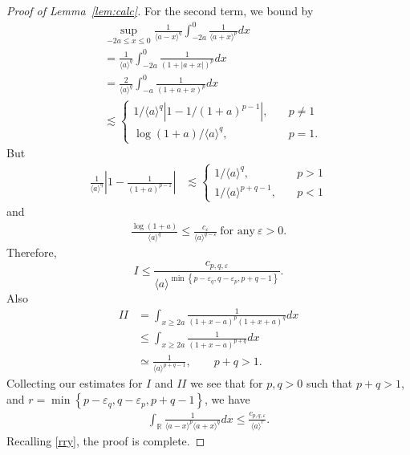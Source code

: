 \documentclass[12pt,reqno]{amsart}
\numberwithin{equation}{section}  %
\numberwithin{figure}{section}
\newcommand{\rr}{\mathbb{R}}
\newcommand{\ee}{\varepsilon}
\begin{document}
\begin{proof}[Proof of Lemma~\ref{lem:calc}]
%
For the second term, we bound by
%
%
\begin{equation*}
\begin{split}
& \sup_{-2a \le x \le 0} \frac{1}{\langle a - x \rangle
^{q}} \int_{-2a}^{0} \frac{1}{\langle a + x \rangle ^{p}} d x
\\
& = \frac{1}{\langle a \rangle ^{q}} \int_{-2a}^{0} \frac{1}{(1 + | a +
x
|)^{p}} d x 
\\
& = \frac{2}{\langle a \rangle ^{q}} \int_{-a}^{0} \frac{1}{(1 + a +
x)^{p}} d x
\\
& \lesssim
\begin{cases}
1/{\langle a \rangle ^{q}} \left| 1 - 1/{(1 +
a)^{p -1}} \right|, \quad & p \neq 1
\\
\log(1+a)/{\langle a \rangle^{q} }, \quad & p =1.
\end{cases}
\end{split}
\end{equation*}
%
But
%
%
\begin{equation*}
\begin{split}
\frac{1}{\langle a \rangle ^{q}}\left| 1 - \frac{1}{(1 +
a)^{p -1}} \right|
& \lesssim
\begin{cases}
1/{\langle a \rangle ^{q}}, \quad & p > 1
\\
1/{\langle a \rangle ^{p + q -1}}, \quad & p < 1
\end{cases}
\end{split}
\end{equation*}
%
%
and
%
%
\begin{equation*}
\begin{split}
\frac{\log(1 + a)}{\langle a \rangle^{q} } \le  \frac{c_{\ee}}{\langle a
\rangle ^{q - \ee}} \ \text{for any} \ \ee > 0.
\end{split}
\end{equation*}
%
%
%
Therefore,
\begin{equation*}
I \le  \frac{c_{p,q, \ee}}{\langle a \rangle ^{\min\left\{ p-\ee_{q}, q -\ee_{p}, p + q-1 \right\}}}.
\end{equation*}
%
%
Also
%
%
\begin{equation*}
\begin{split}
II 
& = \int_{x \ge 2a} \frac{1}{(1 + x - a)^{p} (1 + x +
a)^{q}} d x
\\
& \le \int_{x \ge 2a} \frac{1}{(1 + x -a)^{p+q}} d x
\\
& \simeq \frac{1}{\langle a \rangle^{p+q -1}}, \qquad p + q > 1.
\end{split}
\end{equation*}
%
%
Collecting our estimates for $I$ and $II$ we see that for 
$p, q > 0$ such that $p +q >1$, and $r =\min\left\{p -\ee_{q}, q - \ee_{p}, p+q-1
\right\}$, we have
\begin{align*}
\int_{\rr} \frac{1}{\langle a - x \rangle ^{p} \langle a + x \rangle
^{q}} d x
\le \frac{c_{p,q, \ee}}{\langle a \rangle ^{r}}.
\label{est-2}
\end{align*}
Recalling
\eqref{rry}, the proof is complete.
\end{proof}
%
%
\end{document}
